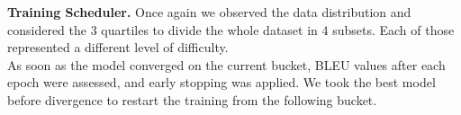 
\noindent\textbf{Training Scheduler.} Once again we observed the data distribution and considered the 3 quartiles
to divide the whole dataset in 4 subsets. Each of those represented a different level of difficulty.\\
As soon as the model converged on the current bucket, BLEU values after each epoch were assessed,
and early stopping was applied. We took the best model before divergence to restart the training 
from the following bucket. 








